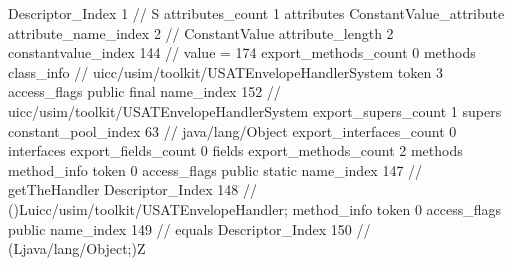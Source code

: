 {{{{{				Descriptor_Index	1		// S
				attributes_count	1
				attributes {
				ConstantValue_attribute {
					attribute_name_index	2		// ConstantValue
					attribute_length	2
					constantvalue_index	144		// value = 174
				}
				}
			}
			}
			export_methods_count	0
			methods {
			}
		}
		class_info {		// uicc/usim/toolkit/USATEnvelopeHandlerSystem
			token	3
			access_flags	public final
			name_index	152		// uicc/usim/toolkit/USATEnvelopeHandlerSystem
			export_supers_count	1
			supers {
				constant_pool_index	63		// java/lang/Object
			}
			export_interfaces_count	0
			interfaces {
			}
			export_fields_count	0
			fields {
			}
			export_methods_count	2
			methods {
				method_info {
					token	0
					access_flags	public static
					name_index	147		// getTheHandler
					Descriptor_Index	148		// ()Luicc/usim/toolkit/USATEnvelopeHandler;
				}
				method_info {
					token	0
					access_flags	public
					name_index	149		// equals
					Descriptor_Index	150		// (Ljava/lang/Object;)Z
				}
			}
		}
	}
}
